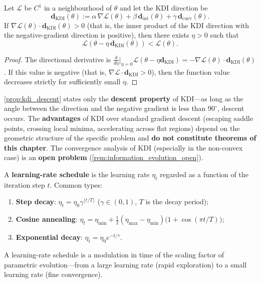 \begin{proposition}\label{prop:kdi_descent}
Let $\mathcal{L}$ be $C^1$ in a neighbourhood of $\theta$ and let the KDI direction be
\[
\mathbf{d}_{\text{KDI}}(\theta) := \alpha\,\nabla\mathcal{L}(\theta) + \beta\,\mathbf{d}_{\text{int}}(\theta) + \gamma\,\mathbf{d}_{\text{curv}}(\theta).
\]
If $\nabla\mathcal{L}(\theta)\cdot\mathbf{d}_{\text{KDI}}(\theta) > 0$ (that is, the inner product of the KDI direction with the negative-gradient direction is positive), then there exists $\eta>0$ such that
\[
\mathcal{L}(\theta - \eta\,\mathbf{d}_{\text{KDI}}(\theta)) < \mathcal{L}(\theta).
\]
\end{proposition}

\begin{proof}
The directional derivative is $\frac{d}{d\eta}\big|_{\eta=0}\mathcal{L}(\theta-\eta\mathbf{d}_{\text{KDI}}) = -\nabla\mathcal{L}(\theta)\cdot\mathbf{d}_{\text{KDI}}(\theta)$. If this value is negative (that is, $\nabla\mathcal{L}\cdot\mathbf{d}_{\text{KDI}} > 0$), then the function value decreases strictly for sufficiently small $\eta$.
\end{proof}

\begin{remark}\label{rem:kdi_boundary}
\cref{prop:kdi_descent} states only the \textbf{descent property} of KDI---as long as the angle between the direction and the negative gradient is less than $90^\circ$, descent occurs. The \textbf{advantages} of KDI over standard gradient descent (escaping saddle points, crossing local minima, accelerating across flat regions) depend on the geometric structure of the specific problem and \textbf{do not constitute theorems of this chapter}. The convergence analysis of KDI (especially in the non-convex case) is an \textbf{open problem} (\cref{rem:information_evolution_open}).
\end{remark}

\begin{definition}\label{def:learning_rate_schedule}
A \textbf{learning-rate schedule} is the learning rate $\eta_t$ regarded as a function of the iteration step $t$. Common types:
\begin{enumerate}[label=(\roman*)]
    \item \textbf{Step decay}: $\eta_t = \eta_0\gamma^{\lfloor t/T\rfloor}$ ($\gamma\in(0,1)$, $T$ is the decay period);
    \item \textbf{Cosine annealing}: $\eta_t = \eta_{\min} + \frac{1}{2}(\eta_{\max}-\eta_{\min})\bigl(1+\cos(\pi t/T)\bigr)$;
    \item \textbf{Exponential decay}: $\eta_t = \eta_0 e^{-t/\tau}$.
\end{enumerate}
A learning-rate schedule is a modulation in time of the scaling factor of parametric evolution---from a large learning rate (rapid exploration) to a small learning rate (fine convergence).
\end{definition}

